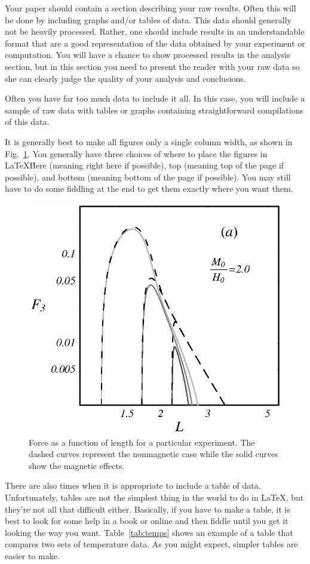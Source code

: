 \documentclass[preprint,pre,floats,aps,amsmath,amssymb]{revtex4}
\begin{document}
Your paper should contain a section describing your raw results. Often this will be done by including graphs and/or tables of data. This data should generally not be heavily processed. Rather, one should include results in an understandable format that are a good representation of the data obtained by your experiment or computation. You will have a chance to show processed results in the analysis section, but in this section you need to present the reader with your raw data so she can clearly judge the quality of your analysis and conclusions.

Often you have far too much data to include it all. In this case, you will include a sample of raw data with tables or graphs containing straightforward compilations of this data.

It is generally best to make all figures only a single column width, as shown in Fig.~\ref{fig:force}. You generally have three choices of where to place the figures in \LaTeX\. Here (meaning right here if possible), top (meaning top of the page if possible), and bottom (meaning bottom of the page if possible). You may still have to do some fiddling at the end to get them exactly where you want them.
\begin{figure}[ht]
\includegraphics[width=2.8 in]{force.eps}
\caption{Force as a function of length for a particular experiment. The dashed curves represent the nonmagnetic case while the solid curves show the magnetic effects.}
\label{fig:force}
\end{figure}

There are also times when it is appropriate to include a table of data. Unfortunately, tables are not the simplest thing in the world to do in \LaTeX, but they're not all that difficult either. Basically, if you have to make a table, it is best to look for some help in a book or online and then fiddle until you get it looking the way you want. Table~\ref{tab:temps} shows an example of a table that compares two sets of temperature data. As you might expect, simpler tables are easier to make.
\end{document}
